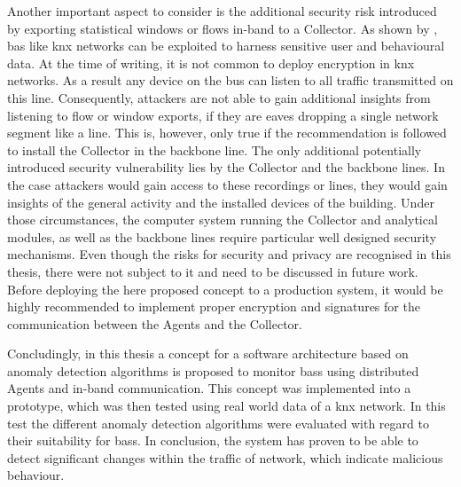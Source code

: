 Another important aspect to consider is the additional security risk introduced by exporting statistical windows or flows in-band to a Collector.
As shown by \textcite{Mundt2012}, \gls{bas} like \gls{knx} networks can be exploited to harness sensitive user and behavioural data.
At the time of writing, it is not common to deploy encryption in \gls{knx} networks.
As a result any device on the bus can listen to all traffic transmitted on this line.
Consequently, attackers are not able to gain additional insights from listening to flow or window exports, if they are eaves dropping a single network segment like a line. This is, however, only true if the recommendation is followed to install the Collector in the backbone line. 
The only additional potentially introduced security vulnerability lies by the Collector and the backbone lines. In the case attackers would gain access to these recordings or lines, they would gain insights of the general activity and the installed devices of the building.
Under those circumstances, the computer system running the Collector and analytical modules, as well as the backbone lines require particular well designed security mechanisms.
Even though the risks for security and privacy are recognised in this thesis, there were not subject to it and need to be discussed in future work.
Before deploying the here proposed concept to a production system, it would be highly recommended to implement proper encryption and signatures for the communication between the Agents and the Collector. %

Concludingly, in this thesis a concept for a software architecture based on anomaly detection algorithms is proposed to monitor \glspl{bas} using distributed Agents and in-band communication. This concept was implemented into a prototype, which was then tested using real world data of a \gls{knx} network.
In this test the different anomaly detection algorithms were evaluated with regard to their suitability for \glspl{bas}.
In conclusion, the system has proven to be able to detect significant changes within the traffic of network, which indicate malicious behaviour.